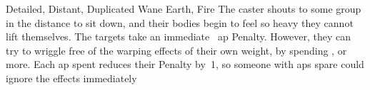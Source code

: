   {Detailed, Distant, Duplicated}%
  {Wane}%
  {Earth, Fire}%
  {}%
  {
    The caster shouts to some group in the distance to sit down, and their bodies begin to feel so heavy they cannot lift themselves.
    The targets take an immediate ~\gls{ap} Penalty.
    However, they can try to wriggle free of the warping effects of their own weight, by spending , or more.
    Each \gls{ap} spent reduces their Penalty by~1, so someone with  \glspl{ap} spare could ignore the effects immediately}%
  {}

